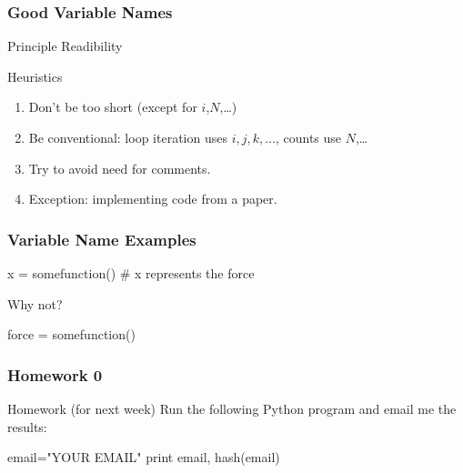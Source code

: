 \begin{frame}[fragile]
\frametitle{Good Variable Names}
\begin{block}{Principle}
Readibility
\end{block}
\begin{block}{Heuristics}
\begin{enumerate}
\item Don't be too short (except for $i$,$N$,\ldots)
\item Be conventional: loop iteration uses $i,j,k,\dots$, counts use $N$,\ldots
\item Try to avoid need for comments.
\item Exception: implementing code from a paper.
\end{enumerate}
\end{block}

\end{frame}

\begin{frame}[fragile]
\frametitle{Variable Name Examples}
\begin{python}
x = somefunction() # x represents the force
\end{python}

Why not?

\begin{python}
force = somefunction()
\end{python}

\end{frame}

\begin{frame}


\end{frame}

\begin{frame}[fragile]
\frametitle{Homework 0}

\begin{block}{Homework (for next week)}
Run the following Python program and email me the results:
\begin{python}
email="YOUR EMAIL"
print email, hash(email)
\end{python}
\end{block}
\end{frame}



